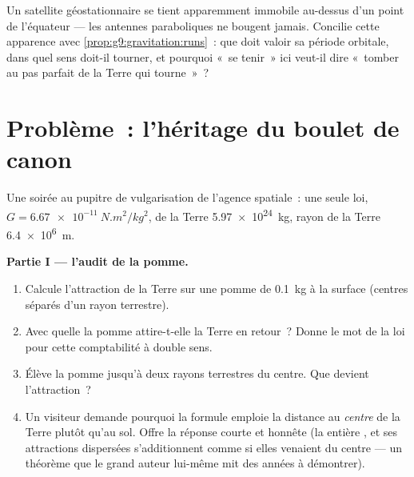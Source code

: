 \begin{exercise}[$\star\star\star$]\label{exo:g9:gravitation:12}
Un satellite géostationnaire se tient apparemment immobile au-dessus
d'un point de l'équateur --- les antennes paraboliques ne bougent
jamais. Concilie cette apparence avec
\cref{prop:g9:gravitation:runs}~: que doit valoir sa période
orbitale, dans quel sens doit-il tourner, et pourquoi «~se tenir~» ici
veut-il dire «~tomber au pas parfait de la Terre qui tourne~»~?
\end{exercise}

\section{Problème~: l'héritage du boulet de canon}

\begin{problem}\label{pb:g9:gravitation:1}
Une soirée au pupitre de vulgarisation de l'agence spatiale~: une
seule loi, $G = \qty{6.67e-11}{N.m^2/kg^2}$,  de la Terre
\qty{5.97e24}{kg}, rayon de la Terre \qty{6.4e6}{m}.

\medskip\noindent\textbf{Partie I --- l'audit de la pomme.}
\begin{enumerate}
  \item Calcule l'attraction de la Terre sur une pomme de
        \qty{0.1}{kg} à la surface (centres séparés d'un rayon
        terrestre).
  \item Avec quelle  la pomme attire-t-elle la Terre en
        retour~? Donne le mot de la loi pour cette comptabilité à
        double sens.
  \item Élève la pomme jusqu'à deux rayons terrestres du centre.
        Que devient l'attraction~?
  \item Un visiteur demande pourquoi la formule emploie la distance
        au \emph{centre} de la Terre plutôt qu'au sol. Offre la
        réponse courte et honnête (la  entière , et
        ses attractions dispersées s'additionnent comme si elles
        venaient du centre --- un théorème que le grand auteur
        lui-même mit des années à démontrer).
\end{enumerate}


\end{problem}
